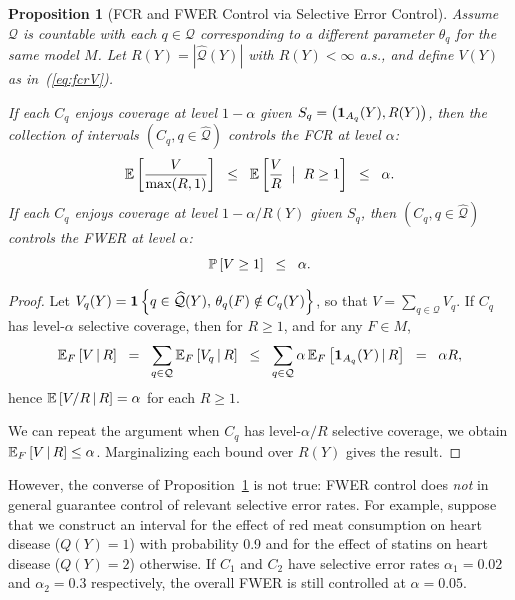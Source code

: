 \documentclass{article}
\newtheorem{proposition}[theorem]{Proposition}
\theoremstyle{definition}
\newcommand{\cQ}{\mathcal{Q}}
\newcommand{\hcQ}{\widehat{\mathcal{Q}}}
\newcommand{\Gv}{\;\;\big|\;\;}
\begin{document}
\begin{proposition}[FCR and FWER Control via Selective Error Control]\label{prop:fcrCont}
  Assume $\cQ$ is countable with each $q\in \cQ$ corresponding to a different parameter $\theta_q$ for the same model $M$. Let $R(Y) = |\hcQ(Y)|$ with $R(Y)<\infty$ a.s., and define $V(Y)$ as in~(\ref{eq:fcrV}).

If each $C_q$ enjoys coverage at level $1-\alpha$ given $S_q = \left(\1_{A_q}(Y),R(Y)\right)$, then the collection of intervals $(C_q, q\in \hcQ)$ controls the FCR at level $\alpha$:
\begin{equation}
  \E\left[\frac{V}{\max(R,1)}\right] \;\;\leq\;\;
  \E\left[\frac{V}{R} \Gv R \geq 1\right] \;\;\leq\;\; \alpha.
\end{equation}
If each $C_q$ enjoys coverage at level $1-\alpha/R(Y)$ given $S_q$, then $(C_q, q\in \hcQ)$ controls the FWER at level $\alpha$:
\begin{equation}
  \P\left[V \geq 1\right] \;\;\leq\;\; \alpha.
\end{equation}

\end{proposition}
\begin{proof}
  Let $V_q(Y) = \1\left\{q\in \hcQ(Y),\, \theta_q(F) \notin C_q(Y)\right\}$,
  so that $V = \sum_{q\in\cQ}V_q$. If $C_q$ has level-$\alpha$ selective coverage, then for $R\geq 1$, and for any $F\in M$,
  \begin{equation}
    \E_F\left[V \gv R \right]
    \;\;=\;\; \sum_{q\in\cQ} \E_F\left[ V_q \gv R\right]
    \;\;\leq\;\; \sum_{q\in\cQ}
    \alpha\,\E_F\left[ \1_{A_q}(Y) \gv R\right]
    \;\;=\;\; \alpha R,
  \end{equation}
  hence $\E\left[V/R \gv R\right] = \alpha$ for each $R\geq 1$.

  We can repeat the argument when $C_q$ has level-$\alpha/R$ selective coverage, we obtain
  $\E_F\left[V \gv R \right] \leq \alpha$. Marginalizing each bound over $R(Y)$ gives the result.
\end{proof}

However, the converse of Proposition~\ref{prop:fcrCont} is not true: FWER control does {\em not} in general guarantee control of relevant selective error rates. For example, suppose that we construct an interval for the effect of red meat consumption on heart disease ($Q(Y)=1$) with probability 0.9 and for the effect of statins on heart disease ($Q(Y)=2$) otherwise. If $C_1$ and $C_2$ have selective error rates $\alpha_1=0.02$ and $\alpha_2 = 0.3$ respectively, the overall FWER is still controlled at $\alpha=0.05$.
\end{document}
